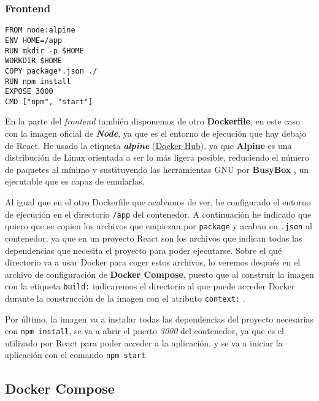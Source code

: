\subsubsection{Frontend} \label{dockerfile-frontend}

\begin{lstlisting}
FROM node:alpine
ENV HOME=/app
RUN mkdir -p $HOME
WORKDIR $HOME
COPY package*.json ./
RUN npm install
EXPOSE 3000
CMD ["npm", "start"]
\end{lstlisting}

En la parte del \textit{frontend} también disponemos de otro \textbf{Dockerfile}, en este caso con la imagen oficial de \textit{\textbf{Node}}, ya que es el entorno de ejecución que hay debajo de React. He usado la etiqueta \textit{\textbf{alpine}} (\href{https://hub.docker.com/layers/library/node/alpine/images/sha256-923cd6fac65f6892aa8bbb4208ad708c56b35f9ab86eca07ccc7b56dd28c9c77?context=explore}{Docker Hub}), ya que \textbf{Alpine} es una distribución de Linux orientada a ser lo más ligera posible, reduciendo el número de paquetes al mínimo y sustituyendo las herramientas GNU por \textbf{BusyBox} \cite{wikipedia:busybox}, un ejecutable que es capaz de emularlas.

Al igual que en el otro Dockerfile que acabamos de ver, he configurado el entorno de ejecución en el directorio \verb,/app, del contenedor. A continuación he indicado que quiero que se copien los archivos que empiezan por \verb,package, y acaban en \verb,.json, al contenedor, ya que en un proyecto React son los archivos que indican todas las dependencias que necesita el proyecto para poder ejecutarse. Sobre el qué directorio va a usar Docker para coger estos archivos, lo veremos después en el archivo de configuración de \textbf{Docker Compose}, puesto que al construir la imagen con la etiqueta \verb,build:, indicaremos el directorio al que puede acceder Docker durante la construcción de la imagen con el atributo \verb,context:, \cite{docker:build-context}.

Por último, la imagen va a instalar todas las dependencias del proyecto necesarias con \verb,npm install,, se va a abrir el puerto \textit{3000} del contenedor, ya que es el utilizado por React para poder acceder a la aplicación, y se va a iniciar la aplicación con el comando \verb,npm start,. 

\subsection{Docker Compose}

